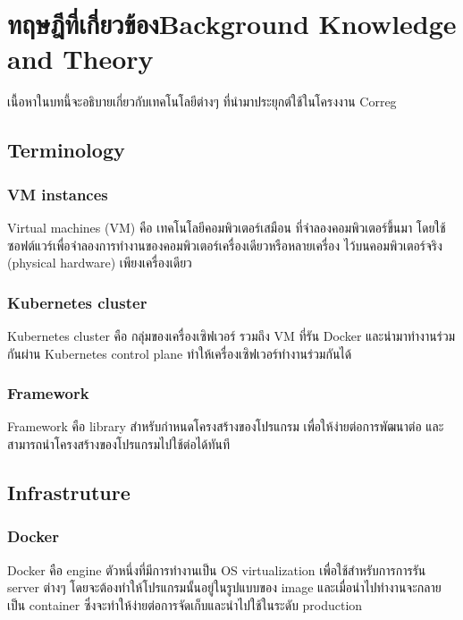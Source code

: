 \chapter{\ifcpe ทฤษฎีที่เกี่ยวข้อง\else Background Knowledge and Theory\fi}
\label{ch:background}

เนื้อหาในบทนี้จะอธิบายเกี่ยวกับเทคโนโลยีต่างๆ ที่นำมาประยุกต์ใช้ในโครงงาน Correg

\section{Terminology}

\subsection{VM instances}

Virtual machines (VM) \cite{vm} คือ เทคโนโลยีคอมพิวเตอร์เสมือน ที่จำลองคอมพิวเตอร์ขึ้นมา โดยใช้ซอฟต์แวร์เพื่อจำลองการทำงานของคอมพิวเตอร์เครื่องเดียวหรือหลายเครื่อง ไว้บนคอมพิวเตอร์จริง (physical hardware) เพียงเครื่องเดียว

\subsection{Kubernetes cluster}

Kubernetes cluster คือ กลุ่มของเครื่องเซิฟเวอร์ รวมถึง VM ที่รัน Docker และนำมาทำงานร่วมกันผ่าน Kubernetes control plane \cite{kubecomp} ทำให้เครื่องเซิฟเวอร์ทำงานร่วมกันได้

\subsection{Framework}

Framework \cite{framework} คือ library สำหรับกำหนดโครงสร้างของโปรแกรม เพื่อให้ง่ายต่อการพัฒนาต่อ และสามารถนำโครงสร้างของโปรแกรมไปใช้ต่อได้ทันที

\section{Infrastruture}

\subsection{Docker}

Docker \cite{docker} คือ engine ตัวหนึ่งที่มีการทำงานเป็น OS virtualization \cite {osvirtual} เพื่อใช้สำหรับการการรัน server ต่างๆ โดยจะต้องทำให้โปรแกรมนั้นอยู่ในรูปแบบของ image และเมื่อนำไปทำงานจะกลายเป็น container ซึ่งจะทำให้ง่ายต่อการจัดเก็บและนำไปใช้ในระดับ production

